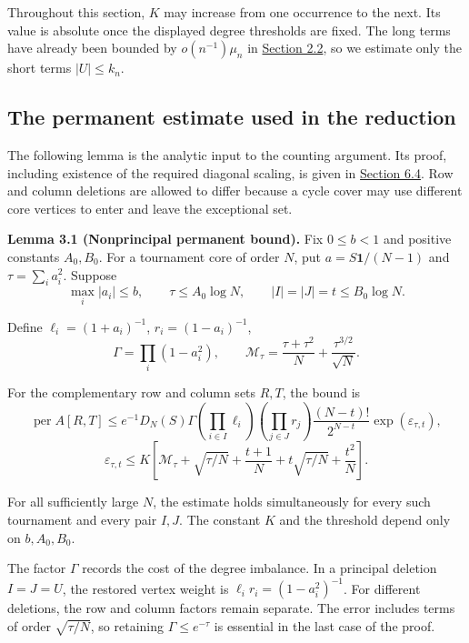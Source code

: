 \documentclass[11pt,a4paper]{article}
\makeatletter
\newcommand{\paperstatement}[3]{\par\addvspace{6pt}\Needspace{4\baselineskip}\phantomsection\def\@currentlabel{#2}\label{#3}\noindent\textbf{#1}\enspace}
\newcommand{\paperref}[2]{\hyperref[#1]{#2}}
\makeatother
\begin{document}
Throughout this section, \(K\) may increase from one occurrence to the next. Its value is absolute once the displayed degree thresholds are fixed. The long terms have already been bounded by \(o(n^{-1})\mu_n\) in \paperref{sec-2.2}{Section 2.2}, so we estimate only the short terms \(|U|\le k_n\).

\subsection{The permanent estimate used in the reduction}\label{sec-3.1}

The following lemma is the analytic input to the counting argument. Its proof, including existence of the required diagonal scaling, is given in \paperref{sec-6.4}{Section 6.4}. Row and column deletions are allowed to differ because a cycle cover may use different core vertices to enter and leave the exceptional set.

\paperstatement{Lemma 3.1 (Nonprincipal permanent bound).}{3.1}{thm-3.1} Fix \(0\le b<1\) and positive constants \(A_0,B_0\). For a tournament core of order \(N\), put \(a=S\mathbf 1/(N-1)\) and \(\tau=\sum_i a_i^2\). Suppose
\[\max_i|a_i|\le b,\qquad
\tau\le A_0\log N,\qquad
|I|=|J|=t\le B_0\log N.\]

Define \(\ell_i=(1+a_i)^{-1}\), \(r_i=(1-a_i)^{-1}\),
\[\Gamma=\prod_i(1-a_i^2),\qquad
\mathcal M_\tau=\frac{\tau+\tau^2}{N}+\frac{\tau^{3/2}}{\sqrt N}.\]

For the complementary row and column sets \(R,T\), the bound is
\[\operatorname{per}A[R,T]\le
e^{-1}D_N(S)\Gamma
\left(\prod_{i\in I}\ell_i\right)
\left(\prod_{j\in J}r_j\right)
\frac{(N-t)!}{2^{N-t}}\exp(\varepsilon_{\tau,t}),\]
\nopagebreak[3]\[\varepsilon_{\tau,t}\le K\left[
\mathcal M_\tau+\sqrt{\tau/N}+\frac{t+1}{N}
+t\sqrt{\tau/N}+\frac{t^2}{N}\right].\]

For all sufficiently large \(N\), the estimate holds simultaneously for every such tournament and every pair \(I,J\). The constant \(K\) and the threshold depend only on \(b,A_0,B_0\).

The factor \(\Gamma\) records the cost of the degree imbalance. In a principal deletion \(I=J=U\), the restored vertex weight is \(\ell_i r_i=(1-a_i^2)^{-1}\). For different deletions, the row and column factors remain separate. The error includes terms of order \(\sqrt{\tau/N}\), so retaining \(\Gamma\le e^{-\tau}\) is essential in the last case of the proof.

\end{document}
